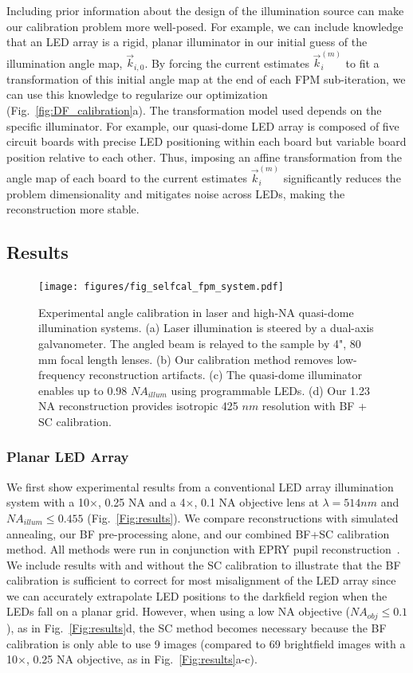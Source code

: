 Including prior information about the design of the illumination source can make our calibration problem more well-posed. For example, we can include knowledge that an LED array is a rigid, planar illuminator in our initial guess of the illumination angle map, $\vec{k}_{i,0}$. By forcing the current estimates $\vec{k}_i^{(m)}$ to fit a transformation of this initial angle map at the end of each FPM sub-iteration, we can use this knowledge to regularize our optimization (Fig.~\ref{fig:DF_calibration}a). The transformation model used depends on the specific illuminator. For example, our quasi-dome LED array is composed of five circuit boards with precise LED positioning within each board but variable board position relative to each other. Thus, imposing an affine transformation from the angle map of each board to the current estimates $\vec{k}_i^{(m)}$ significantly reduces the problem dimensionality and mitigates noise across LEDs, making the reconstruction more stable.

\subsection{Results}

\begin{figure} [t]
	\centering
	\texttt{[image: figures/fig\_selfcal\_fpm\_system.pdf]}
	\caption{Experimental angle calibration in laser and high-NA quasi-dome illumination systems. (a) Laser illumination is steered by a dual-axis galvanometer. The angled beam is relayed to the sample by 4", 80 mm focal length lenses. (b) Our calibration method removes low-frequency reconstruction artifacts. (c) The quasi-dome illuminator enables up to 0.98 $NA_{illum}$ using programmable LEDs. (d) Our 1.23 NA reconstruction provides isotropic 425 $nm$ resolution with BF + SC calibration.
		}
	\label{Fig:laserDome}
\end{figure}

\subsubsection{Planar LED Array}
We first show experimental results from a conventional LED array illumination system with a 10$\times$, 0.25 NA and a 4$\times$, 0.1 NA objective lens at $\lambda = 514 nm$ and $NA_{illum} \leq 0.455$ (Fig.~\ref{Fig:results}). We compare reconstructions with simulated annealing, our BF pre-processing alone, and our combined BF+SC calibration method. All methods were run in conjunction with EPRY pupil reconstruction~\cite{Ou:14}. We include results with and without the SC calibration to illustrate that the BF calibration is sufficient to correct for most misalignment of the LED array since we can accurately extrapolate LED positions to the darkfield region when the LEDs fall on a planar grid. However, when using a low NA objective ($NA_{obj} \leq 0.1$), as in Fig.~\ref{Fig:results}d, the SC method becomes necessary because the BF calibration is only able to use 9 images (compared to 69 brightfield images with a 10$\times$, 0.25 NA objective, as in Fig.~\ref{Fig:results}a-c).

